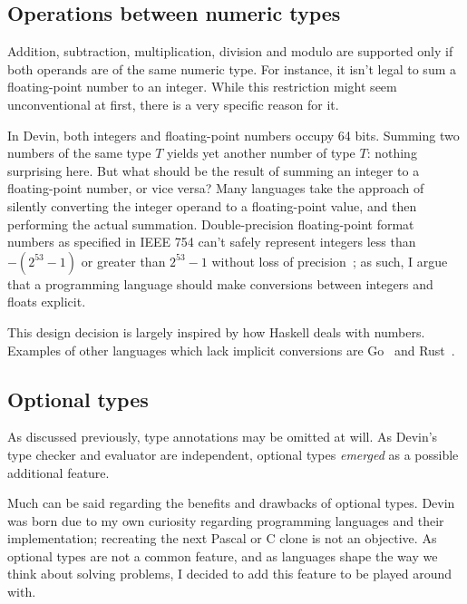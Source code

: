 \documentclass[UdineBachThesis,american,11pt]{PhdThesis}
\begin{document}
  \subsection{Operations between numeric types}

  Addition, subtraction, multiplication, division and modulo are supported only
  if both operands are of the same numeric type. For instance, it isn't legal to
  sum a floating-point number to an integer. While this restriction might seem
  unconventional at first, there is a very specific reason for it.

  In Devin, both integers and floating-point numbers occupy 64 bits. Summing two
  numbers of the same type $T$ yields yet another number of type $T$: nothing
  surprising here. But what should be the result of summing an integer to a
  floating-point number, or vice versa? Many languages take the approach of
  silently converting the integer operand to a floating-point value, and then
  performing the actual summation. Double-precision floating-point format
  numbers as specified in IEEE 754 can't safely represent integers less than
  $-\left(2^{53} - 1\right)$ or greater than $2^{53} - 1$ without loss of
  precision~\cite{mdn-is-safe-integer}; as such, I argue that a programming
  language should make conversions between integers and floats explicit.

  This design decision is largely inspired by how Haskell deals with numbers.
  Examples of other languages which lack implicit conversions are
  Go~\cite{go-numeric-types} and Rust~\cite{rust-conversion}.

  \subsection{Optional types}

  As discussed previously, type annotations may be omitted at will. As Devin's
  type checker and evaluator are independent, optional types \emph{emerged} as a
  possible additional feature.

  Much can be said regarding the benefits and drawbacks of optional types. Devin
  was born due to my own curiosity regarding programming languages and their
  implementation; recreating the next Pascal or C clone is not an objective. As
  optional types are not a common feature, and as languages shape the way we
  think about solving problems, I decided to add this feature to be played
  around with.

  \newpage
\end{document}
